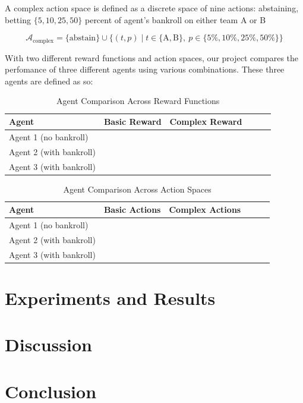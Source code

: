 \documentclass[sigconf]{acmart}
\newcommand{\cmark}{\ding{51}}  %
\begin{document}
A complex action space is defined as a discrete space of nine actions: abstaining, betting $\{5, 10, 25, 50\}$ percent of agent's bankroll on either team A or B

\begin{equation}
\mathcal{A}_{\text{complex}} = \{\text{abstain}\} \cup \{(t, p) \mid t \in \{\text{A}, \text{B}\},\ p \in \{5\%, 10\%, 25\%, 50\%\} \}
\end{equation}

With two different reward functions and action spaces, our project compares the perfomance of three different agents using various combinations. These three agents are defined as so: 

\begin{table}[h]
  \caption{Agent Comparison Across Reward Functions}
  \label{tab:agent_benchmarks}
  \begin{tabular}{lccccc}
    \toprule
    \textbf{Agent} & \textbf{Basic Reward} & \textbf{Complex Reward} \\
    \midrule
    Agent 1 (no bankroll)  & \cmark  &        \\
    Agent 2 (with bankroll)   &         & \cmark \\
    Agent 3 (with bankroll)   &         & \cmark \\
    \bottomrule
  \end{tabular}
\end{table}

\begin{table}[h]
  \caption{Agent Comparison Across Action Spaces}
  \label{tab:agent_benchmarks}
  \begin{tabular}{lccccc}
    \toprule
    \textbf{Agent} & \textbf{Basic Actions} & \textbf{Complex Actions} \\
    \midrule
    Agent 1 (no bankroll)  & \cmark  &         \\
    Agent 2 (with bankroll)   & \cmark  &         \\
    Agent 3 (with bankroll)   &         & \cmark  \\
    \bottomrule
  \end{tabular}
\end{table}

\bigskip
\section{Experiments and Results}


\section{Discussion}
\section{Conclusion}




\end{document}
